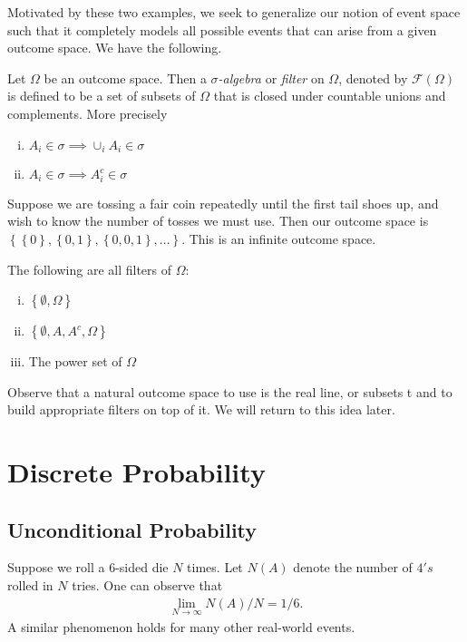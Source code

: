 Motivated by these two examples, we seek to generalize our notion of
event space such that it completely models all possible events
that can arise from a given outcome space. We have the following.
\begin{definition}
	Let $\Omega$ be an outcome space. Then a \emph{$\sigma$-algebra}
	or \emph{filter} on $\Omega$, denoted by $\mathcal{F}(\Omega)$ is defined to be 
	a
	set of subsets of $\Omega$ that is closed under countable
	unions and complements.
	More precisely
	\begin{enumerate}[(i)]
		\item $ A_i \in  \sigma \implies \cup_i A_i \in \sigma$
		\item $A_i \in \sigma \implies A_i^c \in \sigma$
	\end{enumerate}
\end{definition}
\begin{example}
	Suppose we are tossing a fair coin repeatedly until the first tail shoes up,
	and wish to know the number of tosses we must use. Then our outcome space
	is \\ $ \left\{ \left\{ 0 \right\} , \left\{ 0,1 \right\} , \left\{ 0,0,1
	\right\},\ldots \right\}$. This is an infinite outcome space.
\end{example}
\begin{example} The following are all filters of $\Omega$:
	\begin{enumerate}[(i)]
		\item $\left\{ \emptyset, \Omega \right\}$
		\item $\left\{ \emptyset, A, A^c, \Omega \right\}$
		\item The power set of $\Omega$
	\end{enumerate}
\end{example}Observe that a natural outcome space to use is the real line, or subsets
t and to build appropriate filters on top of it. We will return
to this idea later.
\section{Discrete Probability}
\subsection{Unconditional Probability}
Suppose we roll a $6$-sided die $N$ times. Let $N(A)$ denote the number of $4's$
rolled in $N$ tries. One can observe that
\begin{align*}
	\lim_{N \to \infty} N(A)/N = 1/6.
\end{align*}
A similar phenomenon holds for many other real-world events.

